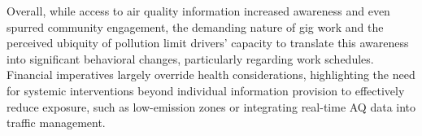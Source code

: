 Overall, while access to air quality information increased awareness and even spurred community engagement, the demanding nature of gig work and the perceived ubiquity of pollution limit drivers' capacity to translate this awareness into significant behavioral changes, particularly regarding work schedules.
Financial imperatives largely override health considerations, highlighting the need for systemic interventions beyond individual information provision to effectively reduce exposure, such as low-emission zones or integrating real-time AQ data into traffic management.